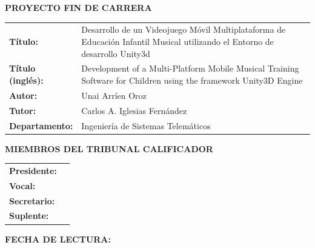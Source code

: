 \cleardoublepage
\thispagestyle{empty}
\vspace*{3\baselineskip}
{\large{\bf PROYECTO FIN DE CARRERA}}
\vspace{0.5cm}

\begin{rm}
\begin{tabular}{p{3cm}p{10cm}}
\textbf{Título:} & Desarrollo de un Videojuego Móvil Multiplataforma de Educación Infantil Musical utilizando el Entorno de desarrollo Unity3d\\ 
\textbf{Título (inglés):} & Development of a Multi-Platform Mobile Musical Training Software for Children using the framework Unity3D Engine\\ 
\textbf{Autor:} & Unai Arríen Oroz \\ 
\textbf{Tutor:} & Carlos A. Iglesias Fernández\\ 
\textbf{Departamento:} & Ingeniería de Sistemas Telemáticos \\ 
\end{tabular} \end{rm} \vspace{1cm}

{\large{\bf MIEMBROS DEL TRIBUNAL CALIFICADOR}} \vspace{0.5cm}

\begin{rm}
\begin{tabular}{p{3cm}p{10cm}}
\textbf{Presidente:} & \\
\textbf{Vocal:} & \\
\textbf{Secretario:} & \\
\textbf{Suplente:} & 
\end{tabular}
\end{rm}
\vspace{1cm}

{\large{\bf FECHA DE LECTURA:}}
\vspace{1cm}

